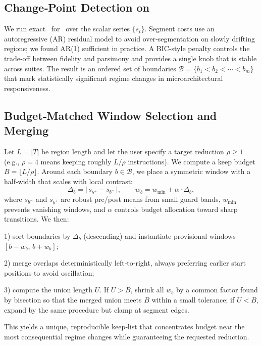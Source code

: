 \subsection{Change‑Point Detection on \pts}
We run exact \pelt\ for \cpd\ over the scalar series \(\{s_t\}\). Segment costs use an autoregressive (AR) residual model to avoid over‑segmentation on slowly drifting regions; we found AR(1) sufficient in practice. A BIC‑style penalty controls the trade‑off between fidelity and parsimony and provides a single knob that is stable across suites. The result is an ordered set of boundaries \(\mathcal{B}=\{b_1<b_2<\cdots<b_m\}\) that mark statistically significant regime changes in microarchitectural responsiveness.

\subsection{Budget‑Matched Window Selection and Merging}
Let \(L=|T|\) be region length and let the user specify a target reduction \(\rho\!\ge\!1\) (e.g., \(\rho\!=\!4\) means keeping roughly \(L/\rho\) instructions). We compute a keep budget \(B=\lfloor L/\rho \rfloor\). Around each boundary \(b\in\mathcal{B}\), we place a symmetric window with a half‑width that scales with local contrast:
\[
\Delta_b=\big|\,s_{b^+}-s_{b^-}\,\big|,\qquad
w_b = w_{\min} + \alpha\cdot \Delta_b,
\]
where \(s_{b^-}\) and \(s_{b^+}\) are robust pre/post means from small guard bands, \(w_{\min}\) prevents vanishing windows, and \(\alpha\) controls budget allocation toward sharp transitions. We then:

1) sort boundaries by \(\Delta_b\) (descending) and instantiate provisional windows \([b-w_b,\,b+w_b]\);

2) merge overlaps deterministically left‑to‑right, always preferring earlier start positions to avoid oscillation;

3) compute the union length \(U\). If \(U>B\), shrink all \(w_b\) by a common factor found by bisection so that the merged union meets \(B\) within a small tolerance; if \(U<B\), expand by the same procedure but clamp at segment edges.

This yields a unique, reproducible keep‑list that concentrates budget near the most consequential regime changes while guaranteeing the requested reduction.

